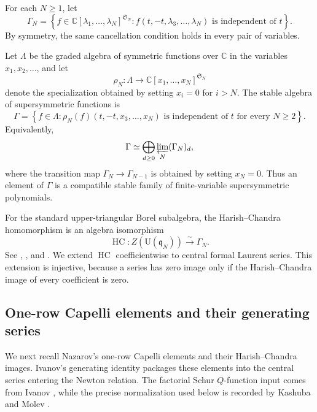 \documentclass[11pt]{amsart}
\numberwithin{equation}{section}
\theoremstyle{definition}
\theoremstyle{remark}
\newcommand{\C}{\mathbb C}
\newcommand{\q}{\mathfrak q}
\newcommand{\U}{\mathrm U}
\newcommand{\HC}{\operatorname{HC}}
\begin{document}
For each \(N\geq1\), let
\begin{equation}
 \Gamma_N=\left\{
 f\in\C[\lambda_1,\ldots,\lambda_N]^{\mathfrak S_N}:
 f(t,-t,\lambda_3,\ldots,\lambda_N)
 \text{ is independent of }t
 \right\}.
 \label{eq:GammaN}
\end{equation}
By symmetry, the same cancellation condition holds in every pair of
variables.

Let \(\Lambda\) be the graded algebra of symmetric functions over
\(\C\) in the variables \(x_1,x_2,\ldots\), and let
\[
\rho_N:\Lambda\longrightarrow
\mathbb{C}[x_1,\ldots,x_N]^{\mathfrak S_N}
\]
denote the specialization obtained by setting \(x_i=0\) for \(i>N\).
The stable algebra of supersymmetric functions is
\[
\Gamma=
\left\{
f\in\Lambda:
\rho_N(f)(t,-t,x_3,\ldots,x_N)
\text{ is independent of \(t\) for every \(N\geq2\)}
\right\}.
\]
Equivalently,
\[
\Gamma\simeq
\bigoplus_{d\geq0}\varprojlim_N(\Gamma_N)_d,
\]
where the transition map \(\Gamma_N\to\Gamma_{N-1}\) is obtained by
setting \(x_N=0\).  Thus an element of \(\Gamma\) is a compatible stable
family of finite-variable supersymmetric polynomials.

For the standard upper-triangular Borel subalgebra, the
Harish--Chandra homomorphism is an algebra isomorphism
\begin{equation}
 \HC:Z(\U(\q_N))\xrightarrow{\ \sim\ }\Gamma_N.
 \label{eq:q-HC}
\end{equation}
See \cite[Section~2.3]{ChengWang2012},
\cite{Sergeev1999}, and \cite[Equation~(5.4)]{KM2025}.  We extend
\(\HC\) coefficientwise to central formal Laurent series.  This
extension is injective, because a series has zero image only if the
Harish--Chandra image of every coefficient is zero.

\subsection{One-row Capelli elements and their generating series}
\label{sec:capelli}
We next recall Nazarov's one-row Capelli elements and their
Harish--Chandra images.  Ivanov's generating identity packages these
elements into the central series entering the Newton relation.  The
factorial Schur \(Q\)-function input comes from Ivanov
\cite{Ivanov2005}, while the precise normalization used below is
recorded by Kashuba and Molev \cite{KM2025}.
\end{document}
